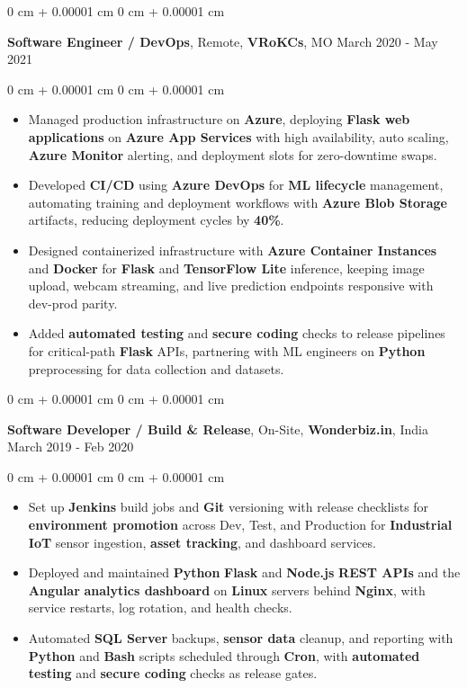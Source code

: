\documentclass[10pt, letterpaper]{article}
\newenvironment{highlights}{
    \begin{itemize}[
        topsep=0.02 cm,
        parsep=0.02 cm,
        partopsep=0pt,
        itemsep=0pt,
        leftmargin=0 cm + 10pt
    ]
}{
    \end{itemize}
} %
\newenvironment{onecolentry}{
    \begin{adjustwidth}{
        0 cm + 0.00001 cm
    }{
        0 cm + 0.00001 cm
    }
}{
    \end{adjustwidth}
} %
\newcommand{\resumeheading}[2]{%
    \begin{onecolentry}
        #1 \hfill #2
    \end{onecolentry}
} %
\begin{document}
\vspace{0.12 cm}
\resumeheading{\textbf{Software Engineer / DevOps}, Remote, \textbf{VRoKCs}, MO}{March 2020 - May 2021}
\begin{onecolentry}
\begin{highlights}
	\item Managed production infrastructure on \textbf{Azure}, deploying \textbf{Flask web applications} on \textbf{Azure App Services} with high availability, auto scaling, \textbf{Azure Monitor} alerting, and deployment slots for zero-downtime swaps.
	\item Developed \textbf{CI/CD} using \textbf{Azure DevOps} for \textbf{ML lifecycle} management, automating training and deployment workflows with \textbf{Azure Blob Storage} artifacts, reducing deployment cycles by \textbf{40\%}.
	\item Designed containerized infrastructure with \textbf{Azure Container Instances} and \textbf{Docker} for \textbf{Flask} and \textbf{TensorFlow Lite} inference, keeping image upload, webcam streaming, and live prediction endpoints responsive with dev-prod parity.
	\item Added \textbf{automated testing} and \textbf{secure coding} checks to release pipelines for critical-path \textbf{Flask} APIs, partnering with ML engineers on \textbf{Python} preprocessing for data collection and datasets.
\end{highlights}
\end{onecolentry}





\vspace{0.12 cm}
\resumeheading{\textbf{Software Developer / Build \& Release}, On-Site, \textbf{Wonderbiz.in}, India}{March 2019 - Feb 2020}

\begin{onecolentry}
\begin{highlights}
	\item Set up \textbf{Jenkins} build jobs and \textbf{Git} versioning with release checklists for \textbf{environment promotion} across Dev, Test, and Production for \textbf{Industrial IoT} sensor ingestion, \textbf{asset tracking}, and dashboard services.
	\item Deployed and maintained \textbf{Python} \textbf{Flask} and \textbf{Node.js} \textbf{REST APIs} and the \textbf{Angular} \textbf{analytics dashboard} on \textbf{Linux} servers behind \textbf{Nginx}, with service restarts, log rotation, and health checks.
	\item Automated \textbf{SQL Server} backups, \textbf{sensor data} cleanup, and reporting with \textbf{Python} and \textbf{Bash} scripts scheduled through \textbf{Cron}, with \textbf{automated testing} and \textbf{secure coding} checks as release gates.
\end{highlights}
\end{onecolentry}
\end{document}
